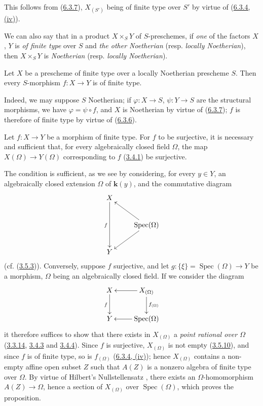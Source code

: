This follows from (\hyperref[I.6.3.7]{6.3.7}), $X_{(S')}$ being of finite
type over $S'$ by virtue of (\hyperref[I.6.3.4]{6.3.4, (iv)}).

We can also say that in a product $X\times_S Y$ of $S$-preschemes, if
\emph{one} of the
factors $X$, $Y$ is \emph{of finite type} over $S$ and
\emph{the other Noetherian} (resp. \emph{locally Noetherian}), then
$X\times_S Y$ is \emph{Noetherian} (resp. \emph{locally Noetherian}).

\begin{corollary}[6.3.9]
\label{I.6.3.9}
Let $X$ be a prescheme of finite type over a locally Noetherian prescheme
$S$. Then every $S$-morphism $f:X\to Y$ is of finite type.
\end{corollary}

Indeed, we may suppose $S$ Noetherian; if $\varphi:X\to S$,
$\psi:Y\to S$ are the structural morphisms, we have $\varphi=\psi\circ f$, and
$X$ is Noetherian by virtue of (\hyperref[I.6.3.7]{6.3.7}); $f$ is
therefore of finite type by virtue of (\hyperref[I.6.3.6]{6.3.6}).

\begin{proposition}[6.3.10]
\label{I.6.3.10}
Let $f:X\to Y$ be a morphism of finite type. For $f$ to be surjective, it is
necessary and sufficient that, for every \textup{algebraically closed} field $\Omega$,
the map $X(\Omega)\to Y(\Omega)$ corresponding to $f$
\textup{(\hyperref[I.3.4.1]{3.4.1})} be surjective.
\end{proposition}

The condition is sufficient, as we see by considering, for every
$y\in Y$, an algebraically closed extension $\Omega$ of $\boldsymbol{k}(y)$, and the
commutative diagram
\[
  \xymatrix{
    X\ar[dd]_f\\
    & \operatorname{Spec}(\Omega)\ar[ul]\ar[dl]\\
    Y
  }
\]
(cf. (\hyperref[I.3.5.3]{3.5.3})). Conversely, suppose $f$
surjective, and let $g:\{\xi\}=\operatorname{Spec}(\Omega)\to Y$ be a
morphism, $\Omega$ being an algebraically closed field. If we consider the
diagram
\[
  \xymatrix{
    X\ar[d]_f &
    X_{(\Omega)}\ar[l]\ar[d]^{f_{(\Omega)}}\\
    Y &
    \operatorname{Spec}(\Omega)\ar[l]
  }
\]
it therefore suffices to show that there exists in $X_{(\Omega)}$ a
\emph{point rational over $\Omega$}
(\hyperref[I.3.3.14]{3.3.14}, \hyperref[I.3.4.3]{3.4.3} and
\hyperref[I.3.4.4]{3.4.4}). Since $f$ is surjective, $X_{(\Omega)}$ is
not empty (\hyperref[I.3.5.10]{3.5.10}), and since $f$ is of finite type,
so is $f_{(\Omega)}$ (\hyperref[I.6.3.4]{6.3.4, (iv)}); hence
$X_{(\Omega)}$ contains a non-empty affine open subset $Z$ such that $A(Z)$ is
a nonzero algebra of finite type over $\Omega$. By virtue of Hilbert's
Nullstellensatz \cite{I-21}, there exists an $\Omega$-homomorphism
$A(Z)\to\Omega$, hence a section of $X_{(\Omega)}$ over
$\operatorname{Spec}(\Omega)$, which proves the proposition.

